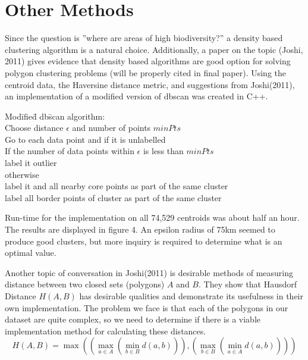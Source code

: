 \documentclass[12pt, fullpage,letterpaper]{article}
\begin{document}
	\section{Other Methods}
	Since the question is ''where are areas of high biodiversity?'' a density based clustering algorithm is a natural choice. Additionally, a paper on the topic (Joshi, 2011) gives evidence that density based algorithms are good option for solving polygon clustering problems (will be properly cited in final paper). Using the centroid data, the Haversine distance metric, and suggestions from Joshi(2011), an implementation of a modified version of dbscan was created in C++.
	\begin{tabbing}
		Mod\= ifie\= d db\= scan algorithm:\\
		\> Choose distance $\epsilon$ and number of points $minPts$\\
		\> Go to each data point and if it is unlabelled\\
		\> \> If the number of data points within $\epsilon$ is less than $minPts$\\
		\> \> \> label it outlier\\
		\> \> otherwise\\
		\> \> \> label it and all nearby core points as part of the same cluster\\
		\> \> \> label all border points of cluster as part of the same cluster\\
	\end{tabbing}

	Run-time for the implementation on all  74,529 centroids was about half an hour. The results are displayed in figure 4. An epsilon radius of 75km seemed to produce good clusters, but more inquiry is required to determine what is an optimal value.
	
	Another topic of conversation in Joshi(2011) is desirable methods of measuring distance between two closed sets (polygons) $A$ and $B$. They show that Hausdorf Distance $H(A,B)$ has desirable qualities and demonstrate its usefulness in their own implementation. The problem we face is that each of the polygons in our dataset are quite complex, so we need to determine if there is a viable implementation method for calculating these distances.
	\begin{equation}
		H(A,B) = \max\left( \left(\max_{a \in A} \left( \min_{b \in B} d(a,b) \right)\right), \left(\max_{b \in B} \left( \min_{a \in A} d(a,b) \right)\right)\right)
	\end{equation}
	
\end{document}
